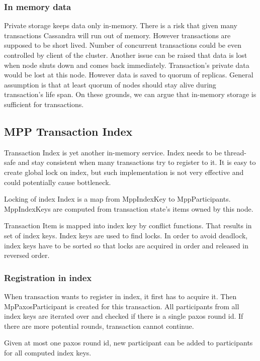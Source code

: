 \subsubsection{In memory data}
Private storage keeps data only in-memory. There is a risk that given many transactions Cassandra will run out of memory. However transactions are supposed to be short lived. Number of concurrent transactions could be even controlled by client of the cluster. 
Another issue can be raised that data is lost when node shuts down and comes back immediately. Transaction’s private data would be lost at this node. However data is saved to quorum of replicas. General assumption is that at least quorum of nodes should stay alive during transaction’s life span. On these grounds, we can argue that in-memory storage is sufficient for transactions.



\subsection{MPP Transaction Index}
Transaction Index is yet another in-memory service. Index needs to be thread-safe and stay consistent when many transactions try to register to it. It is easy to create global lock on index, but such implementation is not very effective and could potentially cause bottleneck. 


Locking of index
Index is a map from MppIndexKey to MppParticipants. MppIndexKeys are computed from transaction state’s items owned by this node. 


Transaction Item is mapped into index key by conflict functions. That results in set of index keys. Index keys are used to find locks. In order to avoid deadlock, index keys have to be sorted so that locks are acquired in order and released in reversed order.


\subsubsection{Registration in index}
When transaction wants to register in index, it first has to acquire it. Then MpPaxosParticipant is created for this transaction. All participants from all index keys are iterated over and checked if there is a single paxos round id. If there are more potential rounds, transaction cannot continue. 


Given at most one paxos round id, new participant can be added to participants for all computed index keys.


